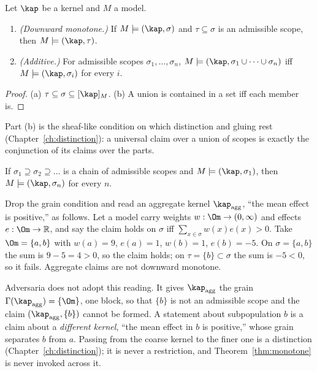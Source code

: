 \begin{theorem}\label{thm:monotone}
Let $\kap$ be a kernel and $M$ a model.
\begin{enumerate}[label=(\alph*)]
\item \emph{(Downward monotone.)} If $M\models(\kap,\sigma)$ and $\tau\subseteq\sigma$ is an admissible scope, then $M\models(\kap,\tau)$.
\item \emph{(Additive.)} For admissible scopes $\sigma_1,\dots,\sigma_n$, $M\models(\kap,\sigma_1\cup\dots\cup\sigma_n)$ iff $M\models(\kap,\sigma_i)$ for every $i$.
\end{enumerate}
\end{theorem}

\begin{proof}
(a) $\tau\subseteq\sigma\subseteq[\kap]_M$. (b) A union is contained in a set iff each member is.
\end{proof}

Part (b) is the sheaf-like condition on which distinction and gluing rest (Chapter~\ref{ch:distinction}): a universal claim over a union of scopes is exactly the conjunction of its claims over the parts.

\begin{corollary}\label{cor:iterated}
If $\sigma_1\supseteq\sigma_2\supseteq\dots$ is a chain of admissible scopes and $M\models(\kap,\sigma_1)$, then $M\models(\kap,\sigma_n)$ for every $n$.
\end{corollary}

\begin{counterexample}\label{cex:simpson}
Drop the grain condition and read an aggregate kernel $\kap_{\mathrm{agg}}$, ``the mean effect is positive,'' as follows. Let a model carry weights $w:\Om\to(0,\infty)$ and effects $e:\Om\to\mathbb R$, and say the claim holds on $\sigma$ iff $\sum_{x\in\sigma}w(x)e(x)>0$. Take $\Om=\{a,b\}$ with $w(a)=9$, $e(a)=1$, $w(b)=1$, $e(b)=-5$. On $\sigma=\{a,b\}$ the sum is $9-5=4>0$, so the claim holds; on $\tau=\{b\}\subset\sigma$ the sum is $-5<0$, so it fails. Aggregate claims are not downward monotone.

Adversaria does not adopt this reading. It gives $\kap_{\mathrm{agg}}$ the grain $\Gamma(\kap_{\mathrm{agg}})=\{\Om\}$, one block, so that $\{b\}$ is not an admissible scope and the claim $(\kap_{\mathrm{agg}},\{b\})$ cannot be formed. A statement about subpopulation $b$ is a claim about a \emph{different kernel}, ``the mean effect in $b$ is positive,'' whose grain separates $b$ from $a$. Passing from the coarse kernel to the finer one is a distinction (Chapter~\ref{ch:distinction}); it is never a restriction, and Theorem~\ref{thm:monotone} is never invoked across it.
\end{counterexample}


